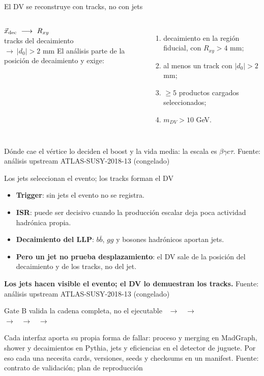 \documentclass[aspectratio=169,10pt]{beamer}
\newcommand{\source}[1]{\vfill{\tiny\color{gray}Fuente: #1}}
\newcommand{\upcode}{análisis upstream ATLAS-SUSY-2018-13 (congelado)}
\begin{document}
\begin{frame}{El DV se reconstruye con tracks, no con jets}
  \begin{columns}[T]
    \centering
    \vspace{0.6em}
    $\vec x_{\rm dec}\ \longrightarrow\ R_{xy}$\\[0.9em]
    tracks del decaimiento\\[0.6em]
    $\longrightarrow\ |d_0|>2$ mm
    El análisis parte de la posición de decaimiento y exige:
    \begin{enumerate}
      \item decaimiento en la región fiducial, con $R_{xy}>4$ mm;
      \item al menos un track con $|d_0|>2$ mm;
      \item $\geq5$ productos cargados seleccionados;
      \item $m_{DV}>10$ GeV.
    \end{enumerate}
  \end{columns}
  \vspace{0.7em}
  Dónde cae el vértice lo deciden el boost y la vida media: la escala es $\beta\gamma c\tau$.
  \source{\upcode}
\end{frame}

\begin{frame}{Los jets seleccionan el evento; los tracks forman el DV}
  \begin{itemize}
    \item \textbf{Trigger}: sin jets el evento no se registra.
    \item \textbf{ISR}: puede ser decisivo cuando la producción escalar deja poca
          actividad hadrónica propia.
    \item \textbf{Decaimiento del LLP}: $b\bar b$, $gg$ y bosones hadrónicos aportan jets.
    \item \textbf{Pero un jet no prueba desplazamiento}: el DV sale de la posición
          del decaimiento y de los tracks, no del jet.
  \end{itemize}
  \vspace{0.9em}
  \centering\textbf{Los jets hacen visible el evento; el DV lo demuestran los tracks.}
  \source{\upcode}
\end{frame}

\begin{frame}{Gate B valida la cadena completa, no el ejecutable}
  \vspace{0.5em}
  \centering\large
  \ $\rightarrow$ \ $\rightarrow$ \\[1em]
  $\rightarrow$ \ $\rightarrow$ \ $\rightarrow$ 
  \vspace{1.2em}

  \normalsize\raggedright
  Cada interfaz aporta su propia forma de fallar: proceso y merging en MadGraph,
  shower y decaimientos en Pythia, jets y eficiencias en el detector de juguete.
  Por eso cada una necesita cards, versiones, seeds y checksums en un manifest.
  \source{contrato de validación; plan de reproducción}
\end{frame}
\end{document}
